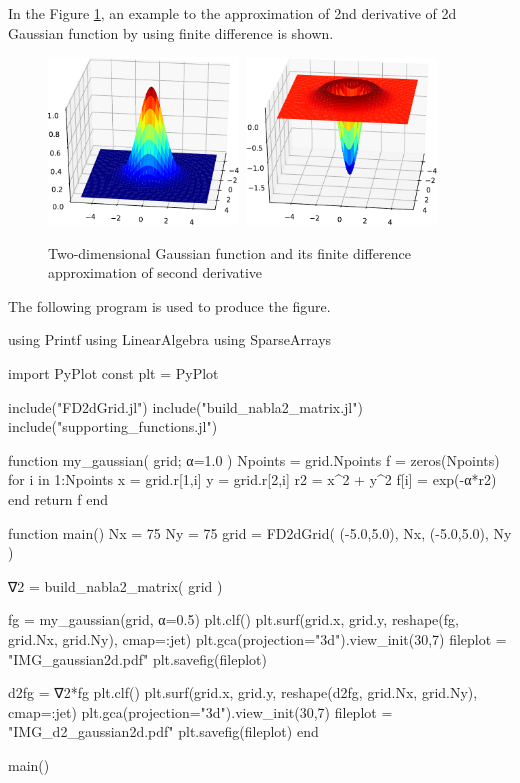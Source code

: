In the Figure \ref{fig:fd_gaussian_2d}, an example to the approximation of 2nd derivative
of 2d Gaussian function by using finite difference is shown.

\begin{figure}[h]
{\center
\includegraphics[width=0.45\textwidth]{../codes/FD2d/IMG_gaussian2d.pdf}\,%
\includegraphics[width=0.45\textwidth]{../codes/FD2d/IMG_d2_gaussian2d.pdf}
\par}
\caption{Two-dimensional Gaussian function and its finite difference
approximation of second derivative}
\label{fig:fd_gaussian_2d}
\end{figure}

The following program is used to produce the figure.
\begin{juliacode}
using Printf
using LinearAlgebra
using SparseArrays
    
import PyPlot
const plt = PyPlot
    
include("FD2dGrid.jl")
include("build_nabla2_matrix.jl")
include("supporting_functions.jl")
    
function my_gaussian( grid; α=1.0 )
  Npoints = grid.Npoints
  f = zeros(Npoints)
  for i in 1:Npoints
    x = grid.r[1,i]
    y = grid.r[2,i]
    r2 = x^2 + y^2
    f[i] = exp(-α*r2)
  end
  return f
end
    
function main()  
  Nx = 75
  Ny = 75
  grid = FD2dGrid( (-5.0,5.0), Nx, (-5.0,5.0), Ny )
    
  ∇2 = build_nabla2_matrix( grid )
    
  fg = my_gaussian(grid, α=0.5)
  plt.clf()
  plt.surf(grid.x, grid.y, reshape(fg, grid.Nx, grid.Ny), cmap=:jet)
  plt.gca(projection="3d").view_init(30,7)
  fileplot = "IMG_gaussian2d.pdf"
  plt.savefig(fileplot)
    
  d2fg = ∇2*fg    
  plt.clf()
  plt.surf(grid.x, grid.y, reshape(d2fg, grid.Nx, grid.Ny), cmap=:jet)
  plt.gca(projection="3d").view_init(30,7)    
  fileplot = "IMG_d2_gaussian2d.pdf"
  plt.savefig(fileplot)
end
    
main()    
\end{juliacode}


